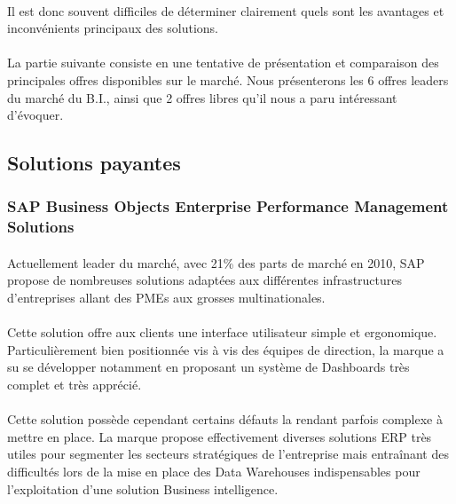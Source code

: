 \paragraph{} Il est donc souvent difficiles de déterminer clairement quels sont les avantages et inconvénients principaux des solutions.  

\paragraph{} La partie suivante consiste en une tentative de présentation et comparaison des principales offres disponibles sur le marché. Nous présenterons les 6 offres leaders du marché du B.I., ainsi que 2 offres libres qu’il nous a paru intéressant d’évoquer.


\subsection{Solutions payantes}

\subsubsection{SAP Business Objects Enterprise Performance Management Solutions }

\paragraph{} Actuellement leader du marché, avec 21\% des parts de marché en 2010, SAP propose de nombreuses solutions adaptées aux différentes infrastructures d’entreprises allant des PMEs aux grosses multinationales.
\paragraph{} Cette solution offre aux clients une interface utilisateur simple et ergonomique. Particulièrement bien positionnée vis à vis des équipes de direction, la marque a su se développer notamment en proposant un système de Dashboards très complet et très apprécié.

\paragraph{} Cette solution possède cependant certains défauts la rendant parfois complexe à mettre en place. La marque propose effectivement diverses solutions ERP très utiles pour segmenter les secteurs stratégiques de l’entreprise mais entraînant des difficultés lors de la mise en place des Data Warehouses indispensables pour l’exploitation d’une solution Business intelligence.

